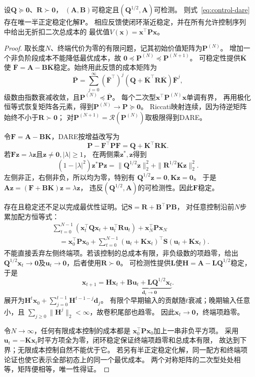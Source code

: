 \begin{theorem}[无限时域LQR的稳定化解]
\label{thm:control-infinite-horizon-lqr}
设$\bm Q\succeq\bm0$、$\bm R\succ\bm0$，
$(\bm A,\bm B)$可稳定且$(\bm Q^{1/2},\bm A)$可检测。
则式~\eqref{eq:control-dare}存在唯一半正定稳定化解$\bm P$。
相应反馈使闭环渐近稳定，并在所有允许控制序列中给出无折扣二次总成本的
最优值$V(\bm x)=\bm x^\top\bm P\bm x$。
\end{theorem}
\begin{proof}
取长度$N$、终端代价为零的有限问题，记其初始价值矩阵为$\bm P^{(N)}$。
增加一个非负阶段成本不能降低最优成本，故
$\bm0\preceq\bm P^{(N)}\preceq\bm P^{(N+1)}$。
可稳定性提供$\overline{\bm K}$使
$\overline{\bm F}=\bm A-\bm B\overline{\bm K}$稳定。始终用此反馈的成本矩阵为
\[
  \overline{\bm P}=\sum_{j=0}^\infty
  (\overline{\bm F}^\top)^j
  (\bm Q+\overline{\bm K}^\top\bm R\overline{\bm K})
  \overline{\bm F}^j,
\]
级数由指数衰减收敛，且$\bm P^{(N)}\preceq\overline{\bm P}$。
每个二次型$\bm x^\top\bm P^{(N)}\bm x$单调有界，
再用极化恒等式恢复矩阵各元素，得到$\bm P^{(N)}\to\bm P\succeq\bm0$。
Riccati映射连续，因为待逆矩阵始终不小于$\bm R\succ\bm0$；
对$\bm P^{(N+1)}=\mathcal R(\bm P^{(N)})$取极限得到DARE。

令$\bm F=\bm A-\bm B\bm K$，DARE按增益改写为
\begin{equation}
  \bm P-\bm F^\top\bm P\bm F=\bm Q+\bm K^\top\bm R\bm K.
  \label{eq:control-dare-lyapunov}
\end{equation}
若$\bm F\bm z=\lambda\bm z$且$\bm z\neq\bm0,|\lambda|\geq1$，
在两侧乘$\bm z^\ast,\bm z$得到
\[
  (1-|\lambda|^2)\bm z^\ast\bm P\bm z
  =\|\bm Q^{1/2}\bm z\|_2^2+\|\bm R^{1/2}\bm K\bm z\|_2^2.
\]
左侧非正，右侧非负，所以均为零，特别有
$\bm Q^{1/2}\bm z=\bm0,\bm K\bm z=\bm0$。
于是$\bm A\bm z=(\bm F+\bm B\bm K)\bm z=\lambda\bm z$，
违反$(\bm Q^{1/2},\bm A)$的可检测性。因此$\bm F$稳定。

存在且稳定还不足以完成最优性证明。记$\bm S=\bm R+\bm B^\top\bm P\bm B$，
对任意控制沿前$N$步累加配方恒等式：
\begin{align*}
  &\sum_{t=0}^{N-1}
    (\bm x_t^\top\bm Q\bm x_t+\bm u_t^\top\bm R\bm u_t)
    +\bm x_N^\top\bm P\bm x_N\\
  &\quad=\bm x_0^\top\bm P\bm x_0+
    \sum_{t=0}^{N-1}
    (\bm u_t+\bm K\bm x_t)^\top\bm S(\bm u_t+\bm K\bm x_t).
\end{align*}
不能直接丢弃左侧终端项。若该控制的总成本有限，非负级数的项趋零，给出
$\bm Q^{1/2}\bm x_t\to\bm0$及$\bm u_t\to\bm0$，后者使用$\bm R\succ\bm0$。
可检测性提供$\bm L$使$\bm H=\bm A-\bm L\bm Q^{1/2}$稳定，于是
\[
  \bm x_{t+1}=\bm H\bm x_t+
       \underbrace{\bm B\bm u_t+\bm L\bm Q^{1/2}\bm x_t}_{\bm d_t\to\bm0}.
\]
展开为$\bm H^t\bm x_0+\sum_{j=0}^{t-1}\bm H^{t-1-j}\bm d_j$。
有限个早期输入的贡献随$t$衰减；晚期输入任意小，且
$\sum_{j\geq0}\|\bm H^j\|_2<\infty$，故卷积尾部也趋零。
因此$\bm x_t\to\bm0$，终端项趋零。

令$N\to\infty$，任何有限成本控制的成本都是
$\bm x_0^\top\bm P\bm x_0$加上一串非负平方项。
采用$\bm u_t=-\bm K\bm x_t$时平方项全为零，闭环稳定保证终端项趋零和总成本有限，
故达到下界；无限成本控制自然不能优于它。
若另有半正定稳定化解，同一配方和终端项论证也使它表示全部初态上的同一个最优成本。
两个对称矩阵的二次型处处相等，矩阵便相等，唯一性得证。
\end{proof}

